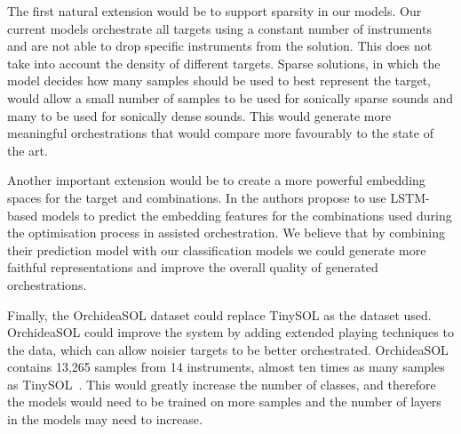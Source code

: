 \documentclass[runningheads,a4paper]{llncs}
\begin{document}
The first natural extension would be to support sparsity in our models. Our current models orchestrate all targets using a constant number of instruments and are not able to drop specific instruments from the solution. This does not take into account the density of different targets. Sparse solutions, in which the model decides how many samples should be used to best represent the target, would allow a small number of samples to be used for sonically sparse sounds and many to be used for sonically dense sounds. This would generate more meaningful orchestrations that would compare more favourably to the state of the art.

Another important extension would be to create a more powerful embedding spaces for the target and combinations. In \cite{Gillick19} the authors propose to use LSTM-based models to predict the embedding features for the combinations used during the optimisation process in assisted orchestration. We believe that by combining their prediction model with our classification models we could generate more faithful representations and improve the overall quality of generated orchestrations.

Finally, the OrchideaSOL dataset could replace TinySOL as the dataset used. OrchideaSOL could improve the system by adding extended playing techniques to the data, which can allow noisier targets to be better orchestrated. OrchideaSOL contains 13,265 samples from 14 instruments, almost ten times as many samples as TinySOL~\cite{Cella2020b}. This would greatly increase the number of classes, and therefore the models would need to be trained on more samples and the number of layers in the models may need to increase. 




\end{document}
